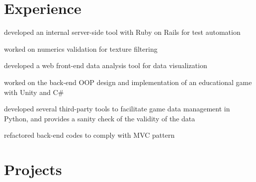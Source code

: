 \documentclass[]{deedy-resume-openfont}
\begin{document}
\hfill
\begin{minipage}[t]{0.66\textwidth} 


\section{Experience}

\vspace{\topsep} %
\begin{tightemize} 
\item developed an internal server-side tool with Ruby on Rails for test automation
\item worked on numerics validation for texture filtering
\item developed a web front-end data analysis tool for data visualization
\end{tightemize}
\sectionsep

\begin{tightemize} 
\item worked on the back-end OOP design and implementation of an educational game with Unity and C\#
\item developed several third-party tools to facilitate game data management in Python, and provides a sanity check of the validity of the data
\item refactored back-end codes to comply with MVC pattern
\end{tightemize}
\sectionsep



\section{Projects}


\end{minipage}
\end{document}
